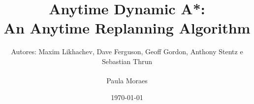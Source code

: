 \title{Anytime Dynamic A*: \\
\Large An Anytime Replanning Algorithm} 
\date{\today}
\author{Autores: Maxim Likhachev, Dave Ferguson, Geoff Gordon, Anthony Stentz e Sebastian Thrun\\
\\Paula Moraes}


